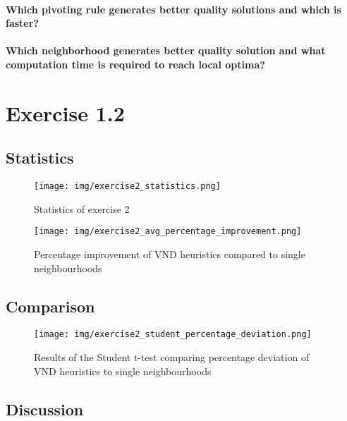 \documentclass[a4paper,10pt]{article}
\begin{document}
\paragraph{Which pivoting rule generates better quality solutions and which is faster?}

\paragraph{Which neighborhood generates better quality solution and what computation time is required to reach local optima?}

\section{Exercise 1.2}

\subsection{Statistics}

\begin{figure}[H]
	\centering
	\caption{Statistics of exercise 2}
	\texttt{[image: img/exercise2\_statistics.png]}
\end{figure}


\begin{figure}[H]
	\centering
	\caption{Percentage improvement of VND heuristics compared to single neighbourhoods}
	\texttt{[image: img/exercise2\_avg\_percentage\_improvement.png]}
\end{figure}

\subsection{Comparison}

\begin{figure}[H]
	\centering
	\caption{Results of the Student t-test comparing percentage deviation of VND heuristics to single neighbourhoods}
	\texttt{[image: img/exercise2\_student\_percentage\_deviation.png]}
\end{figure}

\subsection{Discussion}
\end{document}
